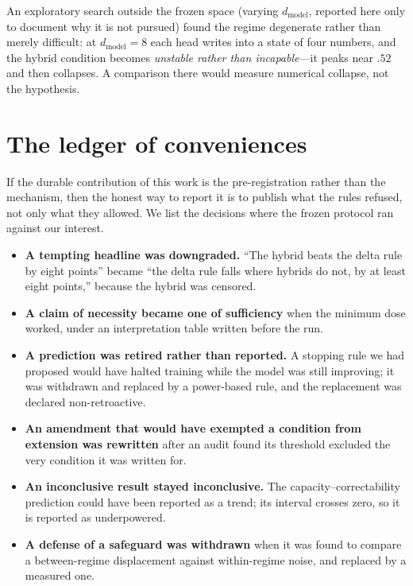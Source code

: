 \documentclass{article}
\begin{document}
An exploratory search outside the frozen space (varying $d_{\text{model}}$, reported here only
to document why it is not pursued) found the regime degenerate rather than merely difficult: at
$d_{\text{model}}=8$ each head writes into a state of four numbers, and the hybrid condition
becomes \emph{unstable rather than incapable}---it peaks near $.52$ and then collapses. A
comparison there would measure numerical collapse, not the hypothesis.

\section{The ledger of conveniences}

If the durable contribution of this work is the pre-registration rather than the mechanism,
then the honest way to report it is to publish what the rules refused, not only what they
allowed. We list the decisions where the frozen protocol ran against our interest.

\begin{itemize}
  \item \textbf{A tempting headline was downgraded.} ``The hybrid beats the delta rule by eight
        points'' became ``the delta rule falls where hybrids do not, by at least eight points,''
        because the hybrid was censored.
  \item \textbf{A claim of necessity became one of sufficiency} when the minimum dose worked,
        under an interpretation table written before the run.
  \item \textbf{A prediction was retired rather than reported.} A stopping rule we had proposed
        would have halted training while the model was still improving; it was withdrawn and
        replaced by a power-based rule, and the replacement was declared non-retroactive.
  \item \textbf{An amendment that would have exempted a condition from extension was rewritten}
        after an audit found its threshold excluded the very condition it was written for.
  \item \textbf{An inconclusive result stayed inconclusive.} The capacity--correctability
        prediction could have been reported as a trend; its interval crosses zero, so it is
        reported as underpowered.
  \item \textbf{A defense of a safeguard was withdrawn} when it was found to compare a
        between-regime displacement against within-regime noise, and replaced by a measured
        one.
\end{itemize}
\end{document}
